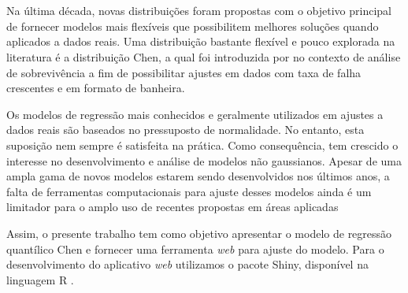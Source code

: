 \documentclass{sciposter}
\begin{document}
\section*{}
\begin{multicols*}{2}{

\setlength{\parindent}{0.4em}

\section*{}
\vspace{0.2cm}

Na última década, novas distribuições foram propostas com o objetivo principal de fornecer modelos mais flexíveis que possibilitem melhores soluções quando aplicados a dados reais. Uma distribuição bastante flexível e pouco explorada na literatura é a distribuição Chen, a qual foi introduzida por \cite{chen2000new} no contexto de análise de sobrevivência a fim de possibilitar ajustes em dados com taxa de falha crescentes e em formato de banheira.
\vspace{0.2cm}

Os modelos de regressão mais conhecidos e  geralmente utilizados em ajustes a dados reais são baseados no pressuposto de normalidade. No entanto, esta suposição nem sempre é satisfeita na prática. Como consequência, tem crescido o interesse no desenvolvimento e análise de modelos não gaussianos. Apesar de uma ampla gama de novos modelos estarem sendo desenvolvidos nos últimos anos, a falta de ferramentas computacionais para ajuste desses modelos ainda é um limitador para o amplo uso de recentes propostas em áreas aplicadas

\vspace{0.2cm}

Assim, o presente trabalho tem como objetivo apresentar o modelo de regressão quantílico Chen e fornecer uma ferramenta \textit{web} para ajuste do modelo. Para o desenvolvimento do aplicativo \textit{web} utilizamos o pacote Shiny, disponível na linguagem R \cite{R}.


\vspace{-0.2cm}

\section*{}
\vspace{0.2cm}

}
\end{multicols*}
\end{document}
